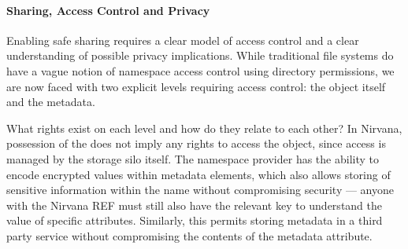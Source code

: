 \paragraph{Sharing, Access Control and Privacy}
Enabling safe sharing requires a clear model of access control and a clear understanding of possible privacy implications.
While traditional file systems do have a vague notion of namespace access control using directory permissions, we are now faced with two explicit levels requiring access control: the object itself and the metadata.

What rights exist on each level and how do they relate to each other?
In Nirvana, possession of the {\REF} does not imply any rights to access the object, since access is managed by the storage silo itself.
The namespace provider has the ability to encode encrypted values within metadata elements, which also allows storing of sensitive information within the name without compromising security --- anyone with the Nirvana {REF} must still also have the relevant key to understand the value of specific attributes.
Similarly, this permits storing metadata in a third party service without compromising the contents of the metadata attribute.




